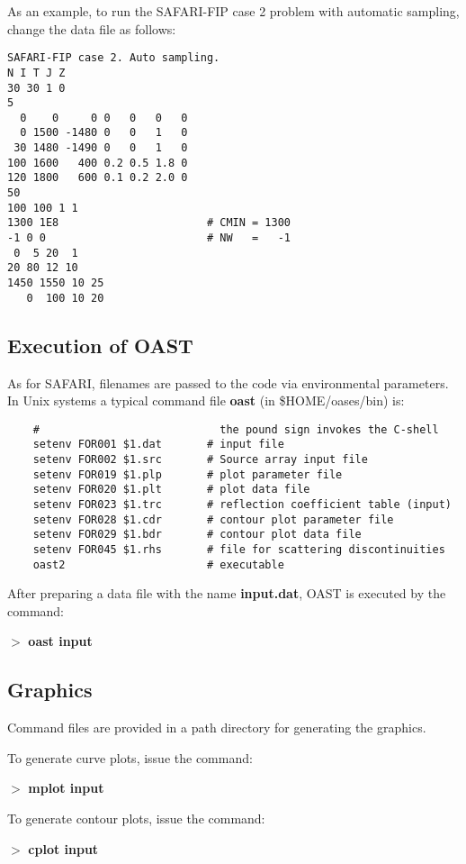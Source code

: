As an example, to run the SAFARI-FIP case 2 problem with automatic
sampling, change the data file as  follows:

\small
\begin{verbatim}
SAFARI-FIP case 2. Auto sampling.
N I T J Z
30 30 1 0
5
  0    0     0 0   0   0   0
  0 1500 -1480 0   0   1   0
 30 1480 -1490 0   0   1   0
100 1600   400 0.2 0.5 1.8 0
120 1800   600 0.1 0.2 2.0 0
50
100 100 1 1
1300 1E8                       # CMIN = 1300
-1 0 0                         # NW   =   -1
 0  5 20  1
20 80 12 10
1450 1550 10 25
   0  100 10 20
\end{verbatim}
\normalsize 

\subsection{Execution of OAST}

    As  for  SAFARI,  filenames  are  passed  to  the  code   via 
environmental parameters. In Unix systems a typical command  file 
{\bf oast} (in  \$HOME/oases/bin) is:

\small
\begin{verbatim}
    #                            the pound sign invokes the C-shell 
    setenv FOR001 $1.dat       # input file 
    setenv FOR002 $1.src       # Source array input file
    setenv FOR019 $1.plp       # plot parameter file
    setenv FOR020 $1.plt       # plot data file  
    setenv FOR023 $1.trc       # reflection coefficient table (input)
    setenv FOR028 $1.cdr       # contour plot parameter file 
    setenv FOR029 $1.bdr       # contour plot data file 
    setenv FOR045 $1.rhs       # file for scattering discontinuities  
    oast2                      # executable
\end{verbatim}
\normalsize

    After preparing a data file with the name {\bf input.dat}, OAST  is 
executed by the command:

    $>$ {\bf oast input}

\subsection{Graphics}  

    Command files are provided in a path directory for generating 
the graphics.

\noindent    To generate curve plots, issue the command:

    $>$ {\bf mplot input}

\noindent    To generate contour plots, issue the command:

    $>$ {\bf cplot input}

